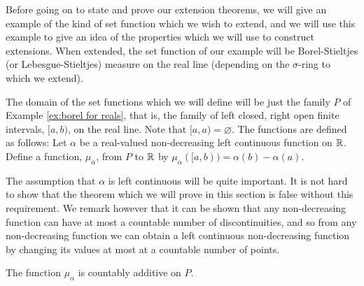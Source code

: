 Before going on to state and prove our extension theorems, we will give an example of the kind of set function which we wish to extend, and we will use this example to give an idea of the properties which we will use to construct extensions. When extended, the set function of our example will be Borel-Stieltjes (or Lebesgue-Stieltjes) measure on the real line (depending on the $\sigma$-ring to which we extend).

\begin{definition}\label{def:stieltjes premeasure}
The domain of the set functions which we will define will be just the family $P$ of Example \ref{ex:borel for reals}, that is, the family of left closed, right open finite intervals, $[a, b)$, on the real line. Note that $[a, a)=\varnothing $. The functions are defined as follows: Let $\alpha$ be a real-valued non-decreasing left continuous function on $\mathbb{R}$. Define a function, $\mu_\alpha$, from $P$ to $\mathbb{R}$ by $\mu_\alpha([a, b))=\alpha(b)-\alpha(a)$.
\end{definition}

The assumption that $\alpha$ is left continuous will be quite important. It is not hard to show that the theorem which we will prove in this section is false without this requirement. We remark however that it can be shown that any non-decreasing function can have at most a countable number of discontinuities, and so from any non-decreasing function we can obtain a left continuous non-decreasing function by changing its values at most at a countable number of points.

\begin{theorem}\label{thm:stieltjes sigma additive}
The function $\mu_\alpha$ is countably additive on $P$.
\end{theorem}

